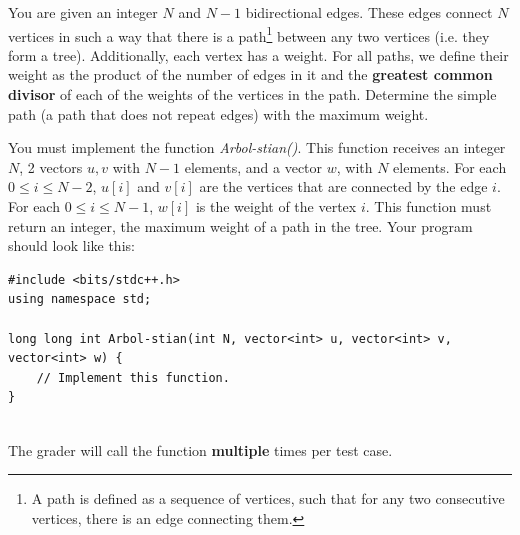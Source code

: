 \documentclass[12pt]{scrartcl}
\begin{document}
    
    
    \vspace{10pt}

    
    
        You are given an integer $N$ and $N - 1$ bidirectional edges. These edges connect $N$ vertices in such a way that there is a path\footnote{A path is defined as a sequence of vertices, such that for any two consecutive vertices, there is an edge connecting them.} between any two vertices (i.e. they form a tree). Additionally, each vertex has a weight. For all paths, we define their weight as the product of the number of edges in it and the {\bfseries greatest common divisor} of each of the weights of the vertices in the path. Determine the simple path (a path that does not repeat edges) with the maximum weight.
    

        You must implement the function \textit{Arbol-stian()}. This function receives an integer $N$, 2 vectors $u, v$ with $N - 1$ elements, and a vector $w$, with $N$ elements. For each $0 \le i \le N - 2$, $u[i]$ and $v[i]$ are the vertices that are connected by the edge $i$. For each $0 \le i \le N - 1$, $w[i]$ is the weight of the vertex $i$. This function must return an integer, the maximum weight of a path in the tree.
        Your program should look like this:

\begin{verbatim}
#include <bits/stdc++.h>
using namespace std;

long long int Arbol-stian(int N, vector<int> u, vector<int> v, vector<int> w) {
    // Implement this function.
}
    
\end{verbatim}

    The grader will call the function \textbf{multiple} times per test case.

    
\end{document}
